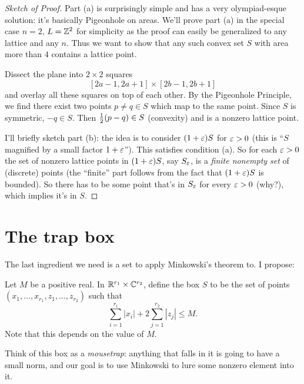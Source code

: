 \begin{proof}[Sketch of Proof]
	Part (a) is surprisingly simple and has a very olympiad-esque solution:
	it's basically Pigeonhole on areas.
	We'll prove part (a) in the special case $n=2$,
	$L = \mathbb Z^2$ for simplicity as the proof
	can easily be generalized to any lattice and any $n$.
	Thus we want to show that any such convex set $S$
	with area more than $4$ contains a lattice point.

	Dissect the plane into $2 \times 2$ squares 
	\[ [2a-1, 2a+1] \times [2b-1, 2b+1] \]
	and overlay all these squares on top of each other.
	By the Pigeonhole Principle, we find there exist two points $p \neq q \in S$ which map to the same point.
	Since $S$ is symmetric, $-q \in S$. Then $\frac{1}{2} (p-q) \in S$ (convexity) and is a nonzero lattice point.

	I'll briefly sketch part (b): the idea is to consider $(1+\varepsilon) S$ for $\varepsilon > 0$
	(this is ``$S$ magnified by a small factor $1+\varepsilon$'').
	This satisfies condition (a). So for each $\varepsilon > 0$ the set of nonzero lattice points in $(1+\varepsilon) S$,
	say $S_\varepsilon$, is a \emph{finite nonempty set} of (discrete) points
	(the ``finite'' part follows from the fact that $(1+\varepsilon)S$ is bounded).
	So there has to be some point that's in $S_\varepsilon$ for every $\varepsilon > 0$ (why?), which implies it's in $S$.
\end{proof}

\section{The trap box}
The last ingredient we need is a set to apply Minkowski's theorem to.  I propose:
\begin{definition}
	Let $M$ be a positive real.
	In $\mathbb R^{r_1} \times \mathbb C^{r_2}$, define the box $S$ to be the
	set of points $(x_1, \dots, x_{r_1}, z_1, \dots, z_{r_2})$ such that
	\[
		\sum_{i=1}^{r_1} \left\lvert x_i \right\rvert
		+ 2 \sum_{j=1}^{r_2} \left\lvert z_j \right\rvert
		\le M. 
	\]
	Note that this depends on the value of $M$.
\end{definition}

Think of this box as a \emph{mousetrap}: anything that falls in it is going to have a small norm,
and our goal is to use Minkowski to lure some nonzero element into it.

